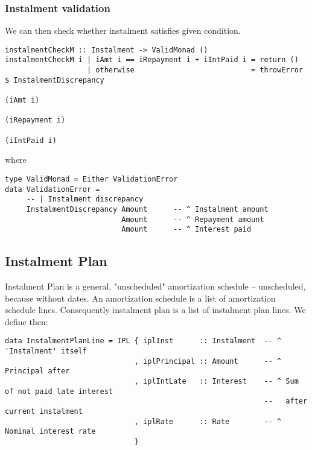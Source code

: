 \documentclass[letterpaper,11pt]{article}
\begin{document}
\subsubsection {Instalment validation}

We can then check whether instalment satisfies given condition.

{\small
\begin{samepage}
\begin{verbatim}
instalmentCheckM :: Instalment -> ValidMonad ()
instalmentCheckM i | iAmt i == iRepayment i + iIntPaid i = return ()
                   | otherwise                           = throwError $ InstalmentDiscrepancy
                                                                        (iAmt i)
                                                                        (iRepayment i)
                                                                        (iIntPaid i)
\end{verbatim}
\end{samepage}
}

where

{\small
\begin{verbatim}
type ValidMonad = Either ValidationError
data ValidationError =
     -- | Instalment discrepancy
     InstalmentDiscrepancy Amount      -- ^ Instalment amount
                           Amount      -- ^ Repayment amount
                           Amount      -- ^ Interest paid
\end{verbatim}
}


\subsection {Instalment Plan}

Instalment Plan is a general, "unscheduled" amortization schedule -- unscheduled, because without dates.
An amortization schedule is a list of amortization schedule lines. Consequently instalment plan
is a list of instalment plan lines. We define then:

{\small
\begin{samepage}
\begin{verbatim}
data InstalmentPlanLine = IPL { iplInst      :: Instalment  -- ^ 'Instalment' itself
                              , iplPrincipal :: Amount      -- ^ Principal after
                              , iplIntLate   :: Interest    -- ^ Sum of not paid late interest
                                                            --   after current instalment
                              , iplRate      :: Rate        -- ^ Nominal interest rate
                              }
\end{verbatim}
\end{samepage}
}
\end{document}
